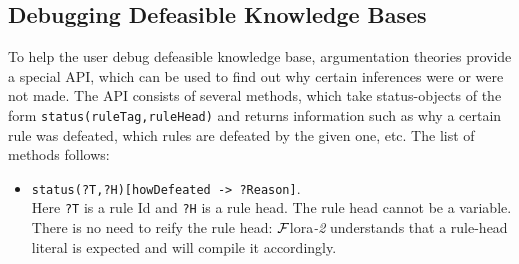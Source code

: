 \documentclass[11pt]{article}
\newcommand{\FLSYSTEM}{{\mbox{\sc ${\cal F}${lora}\rm\emph{-2}}}\xspace}
\begin{document}
\subsection{Debugging Defeasible Knowledge Bases}
\label{sec-debugging-defeat}

To help the user debug defeasible knowledge base, argumentation
theories provide a special API, which can be used to find out
why certain inferences were or were not made.
The API consists of several methods, which take status-objects of the form
{\tt status(ruleTag,ruleHead)} and returns information such as why a certain
rule was defeated, which rules are defeated by the given one, etc.
The list of methods follows:
\begin{itemize}
\item  {\tt status(?T,?H)[howDefeated -> ?Reason]}.\\
  Here {\tt ?T} is a rule Id and {\tt ?H} is a rule head. The rule head
  cannot be a variable. There is no need to reify the rule head: \FLSYSTEM
  understands that a rule-head literal is expected and will compile it
  accordingly.  


\end{itemize}
\end{document}
